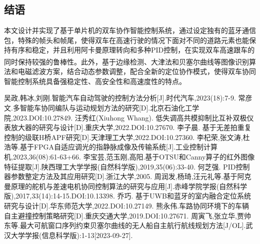 \documentclass{article}%
\begin{document}
\begin{multicols}{2}
		\section{结语}
		本文设计并实现了基于单片机的双车协作智能控制系统，通过设定独有的蓝牙通信包，特殊的帧头和帧尾，使得双车在高速行驶的情况下面对不同的道路元素也能保持有序和稳定，并且利用阿卡曼原理转向和多种PID控制，在实现双车高速跟车的同时保持较强的鲁棒性。此外，基于边缘检测、大津法和贝塞尔曲线\textsuperscript{\cite{ref11}}等图像识别算法和电磁滤波方案，结合动态参数调整，配合全新的定位协作模式，使得双车协同智能控制系统具备强稳定性、高安全性和高速度性的特点。
				
		\begin{thebibliography}{15}%
			
			吴政,韩冰,刘刚.智能汽车自动驾驶的控制方法分析[J].时代汽车,2023(18):7-9.			
			常彦文.多智能车协同编队与运动规划方法的研究[D].北京石油化工学院,2023.DOI:10.27849.
			汪秀红(Xiuhong Whang). 低失调高共模抑制比互补双极仪表放大器的研究与设计[D].重庆大学,2022.DOI:10.27670.
			李子晨. 基于无差拍重复控制的级联H桥APF研究[D].天津理工大学,2022.DOI:10.27360.
			李杞荣,张文涛,杜浩等.基于FPGA自适应调光的指静脉成像及传输系统[J].工业控制计算机,2023,36(08):61-63+66.
			李宝芸,范玉刚,高阳.基于OTSU和Canny算子的红外图像特征提取[J].陕西理工大学学报(自然科学版),2019,35(06):33-40.
			何芝强. PID控制器参数整定方法及其应用研究[D].浙江大学,2005.
			周润发,杨琦,汪元礼等.基于阿克曼原理的舵机与差速电机协同控制算法的研究与应用[J].赤峰学院学报(自然科学版),2017,33(14):14-15.DOI:10.13398.
			乔巧. 基于UWB和蓝牙的室内融合定位系统研究与设计[D].华东师范大学,2022.DOI:10.27149.
			熊永伟.车路协同环境下的车辆自主避撞控制策略研究[D].重庆交通大学,2019.DOI:10.27671.
			周寅飞,张立华,贾帅东等.最大可航窗口序列约束贝塞尔曲线的无人船自主航行航线规划方法[J/OL].武汉大学学报(信息科学版):1-13[2023-09-27].
		\end{thebibliography}
		
	\end{multicols}%
	
		
\end{document}
